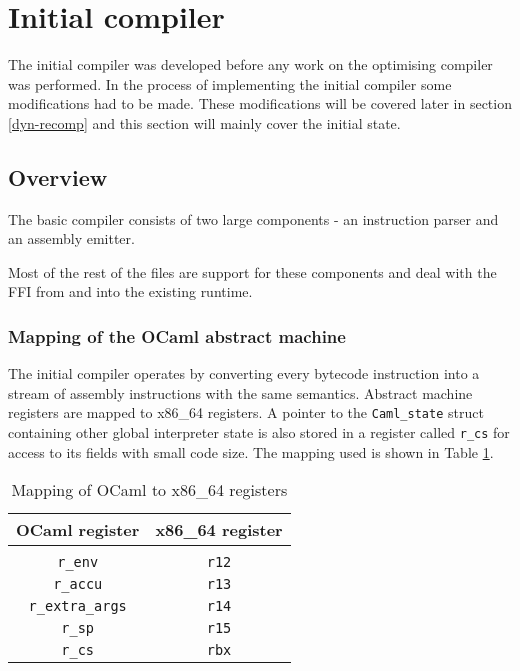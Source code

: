 \section{Initial compiler}

The initial compiler was developed before any work on the optimising compiler was performed. In the
process of implementing the initial compiler some modifications had to be made. These modifications
will be covered later in section \ref{dyn-recomp} and this section will mainly cover the initial
state.

\subsection{Overview}

The basic compiler consists of two large components - an instruction parser and an assembly
emitter.

Most of the rest of the files are support for these components and deal with the FFI from and into
the existing runtime.

\subsubsection{Mapping of the OCaml abstract machine}

The initial compiler operates by converting every bytecode instruction into a stream of assembly
instructions with the same semantics. Abstract machine registers are mapped to x86\_64 registers. A
pointer to the \texttt{Caml\_state} struct containing other global interpreter state is also
stored in a register called \texttt{r\_cs} for access to its fields with small code size. The
mapping used is shown in Table \ref{table:regmap}.

\begin{table}[h]
      \centering
      \begin{tabular}{cc}\toprule
            OCaml register          & x86\_64 register \\
            \midrule                                   \\
            \texttt{r\_env}         & \texttt{r12}     \\
            \texttt{r\_accu}        & \texttt{r13}     \\
            \texttt{r\_extra\_args} & \texttt{r14}     \\
            \texttt{r\_sp}          & \texttt{r15}     \\
            \texttt{r\_cs}          & \texttt{rbx}     \\
            \bottomrule
      \end{tabular}

      \caption{Mapping of OCaml to x86\_64 registers}
      \label{table:regmap}
\end{table}

